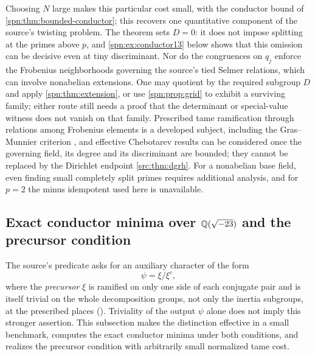 Choosing $N$ large makes this particular cost small, with the conductor bound
of \cref{spn:thm:bounded-conductor}; this recovers one quantitative component
of the source's twisting problem. The theorem sets $D=0$: it does not
impose splitting at the primes above $p$, and \cref{spn:ex:conductor13}
below shows that this omission can be decisive even at tiny discriminant. Nor
do the congruences on $q_j$ enforce the Frobenius neighborhoods governing the
source's tied Selmer relations, which can involve nonabelian extensions. One
may quotient by the required subgroup $D$ and apply
\cref{spn:thm:extension}, or use \cref{spn:prop:grid} to exhibit a surviving
family; either route still needs a proof that the determinant or
special-value witness does not vanish on that family. Prescribed tame
ramification through relations among Frobenius elements is a developed
subject, including the Gras--Munnier criterion \cite{Hajir2022Tame}, and
effective Chebotarev results \cite{Thorner2017Explicit} can be considered
once the governing field, its degree and its discriminant are bounded; they
cannot be replaced by the Dirichlet endpoint \cref{src:thm:dgrh}. For a
nonabelian base field, even finding small completely split primes requires
additional analysis, and for $p=2$ the minus idempotent used here is
unavailable.


\subsection{Exact conductor minima over \texorpdfstring{$\mathbb{Q}(\sqrt{-23})$}{Q(sqrt(-23))} and the precursor condition}\label{spn:sec:benchmark}

The source's predicate  asks for an auxiliary character of the
form
\[
 \psi=\xi/\xi^c ,
\]
where the \emph{precursor} $\xi$ is ramified on only one side of each
conjugate pair and is itself trivial on the whole decomposition groups, not
only the inertia subgroups, at the prescribed places
(). Triviality of the output $\psi$
alone does not imply this stronger assertion. This subsection makes the
distinction effective in a small benchmark, computes the exact conductor
minima under both conditions, and realizes the precursor condition with
arbitrarily small normalized tame cost.

